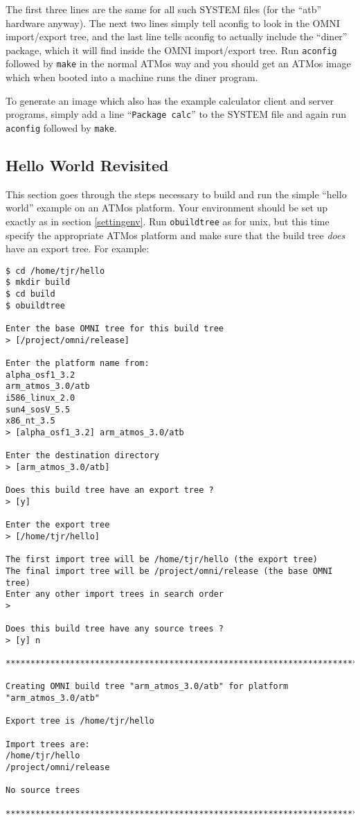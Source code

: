 \documentclass[11pt,twoside,onecolumn]{article}
\begin{document}
The first three lines are the same for all such SYSTEM files (for the ``atb''
hardware anyway).  The next two lines simply tell aconfig to look in the OMNI
import/export tree, and the last line tells aconfig to actually include the
``diner'' package, which it will find inside the OMNI import/export tree.  Run
{\tt aconfig} followed by {\tt make} in the normal ATMos way and you should get
an ATMos image which when booted into a machine runs the diner program.

To generate an image which also has the example calculator client and server
programs, simply add a line ``{\tt Package calc}'' to the SYSTEM file and again
run {\tt aconfig} followed by {\tt make}.

\subsection{Hello World Revisited}
\label{atmoshello}

This section goes through the steps necessary to build and run the simple
``hello world'' example on an ATMos platform.  Your environment should be set
up exactly as in section \ref{settingenv}.  Run {\tt obuildtree} as for unix,
but this time specify the appropriate ATMos platform and make sure that the
build tree {\em does} have an export tree. For example:

{\footnotesize \begin{verbatim}
$ cd /home/tjr/hello
$ mkdir build
$ cd build
$ obuildtree

Enter the base OMNI tree for this build tree
> [/project/omni/release] 

Enter the platform name from:
alpha_osf1_3.2
arm_atmos_3.0/atb
i586_linux_2.0
sun4_sosV_5.5
x86_nt_3.5
> [alpha_osf1_3.2] arm_atmos_3.0/atb

Enter the destination directory
> [arm_atmos_3.0/atb] 

Does this build tree have an export tree ?
> [y] 

Enter the export tree
> [/home/tjr/hello] 

The first import tree will be /home/tjr/hello (the export tree)
The final import tree will be /project/omni/release (the base OMNI tree)
Enter any other import trees in search order
> 

Does this build tree have any source trees ?
> [y] n

************************************************************************

Creating OMNI build tree "arm_atmos_3.0/atb" for platform "arm_atmos_3.0/atb"

Export tree is /home/tjr/hello

Import trees are:
/home/tjr/hello
/project/omni/release

No source trees

************************************************************************

\end{verbatim}}
\end{document}

